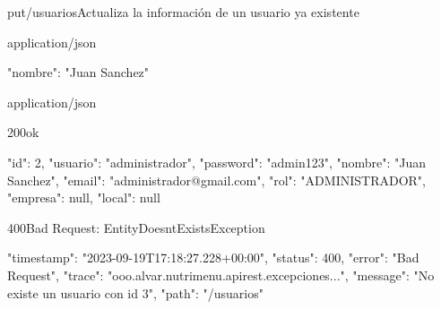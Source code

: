 \begin{apiRoute}{put}{/usuarios}{Actualiza la información de un usuario ya existente}
	\begin{routeParameter}
	\end{routeParameter}
	
	\begin{routeRequest}{application/json}
		\begin{routeRequestBody}
{
	"nombre": "Juan Sanchez"
}
		\end{routeRequestBody}
	\end{routeRequest}
	\begin{routeResponse}{application/json}
		\begin{routeResponseItem}{200}{ok}
			\begin{routeResponseItemBody}
{
    "id": 2,
    "usuario": "administrador",
    "password": "admin123",
    "nombre": "Juan Sanchez",
    "email": "administrador@gmail.com",
    "rol": "ADMINISTRADOR",
    "empresa": null,
    "local": null
}
			\end{routeResponseItemBody}
		\end{routeResponseItem}
		\begin{routeResponseItem}{400}{Bad Request: EntityDoesntExistsException}
			\begin{routeResponseItemBody}
{
    "timestamp": "2023-09-19T17:18:27.228+00:00",
    "status": 400,
    "error": "Bad Request",
    "trace": "ooo.alvar.nutrimenu.apirest.excepciones...",
    "message": "No existe un usuario con id 3",
    "path": "/usuarios"
}
			\end{routeResponseItemBody}
		\end{routeResponseItem}
	\end{routeResponse}
\end{apiRoute}

